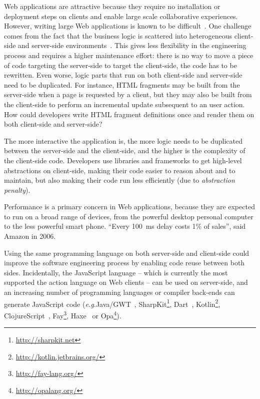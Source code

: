 \documentclass[preprint]{sigplanconf}
\newcommand{\eg}{\emph{e.g.}}
\begin{document}
Web applications are attractive because they require no installation or deployment steps on clients
and enable large scale collaborative experiences. However, writing large Web applications is known
to be difficult~\cite{Mikkonen08_SpaghettiJs,Preciado05_RIAMethodologyNecessity}. One challenge
comes from the fact that the business logic is scattered into heterogeneous client-side and
server-side environments~\cite{Echeverria09_RIA,Kuuskeri09_PartitioningClientServer}. This gives
less flexibility in the engineering process and requires a higher maintenance effort: there is no
way to move a piece of code targeting the server-side to target the client-side, the code has to be
rewritten. Even worse, logic parts that run on both client-side and server-side need to be
duplicated. For instance, HTML fragments may be built from the server-side when a page is requested
by a client, but they may also be built from the client-side to perform an incremental update
subsequent to an user action. How could developers write HTML fragment definitions once and render
them on both client-side and server-side?

The more interactive the application is, the more logic needs to be duplicated between the
server-side and the client-side, and the higher is the complexity of the client-side code.
Developers use libraries and frameworks to get high-level abstractions on client-side, making their
code easier to reason about and to maintain, but also making their code run less efficiently (due to
\emph{abstraction penalty}).

Performance is a primary concern in Web applications, because they are expected to run on a broad
range of devices, from the powerful desktop personal computer to the less powerful smart phone.
“Every 100~ms delay costs 1\% of sales”, said Amazon in 2006.

Using the same programming language on both server-side and client-side could improve the software
engineering process by enabling code reuse between both sides. Incidentally, the JavaScript language
-- which is currently the most supported the action language on Web clients -- can be used on
server-side, and an increasing number of programming languages or compiler back-ends can generate
JavaScript code (\eg Java/GWT~\cite{Chaganti07_GWT},
SharpKit\footnote{\href{http://sharpkit.net}{http://sharpkit.net}}, Dart~\cite{Griffith11_Dart},
Kotlin\footnote{\href{http://kotlin.jetbrains.org/}{http://kotlin.jetbrains.org/}},
ClojureScript~\cite{McGranaghan11_ClojureScript},
Fay\footnote{\href{http://fay-lang.org/}{http://fay-lang.org/}},
Haxe~\cite{Cannasse08_HaXe} or Opa\footnote{\href{http://opalang.org/}{http://opalang.org/}}).
\end{document}
